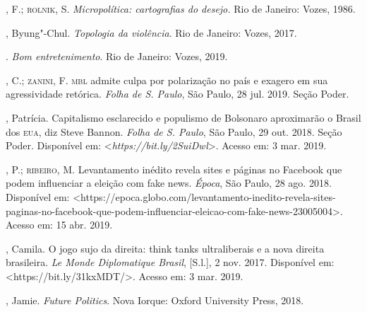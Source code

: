 \begin{bibliohedra}
, F.; \textsc{rolnik}, S. \emph{Micropolítica: cartografias do desejo.}
Rio de Janeiro: Vozes, 1986.

, Byung"-Chul. \emph{Topologia da violência}. Rio de Janeiro: Vozes,
2017.

\titidem. \emph{Bom entretenimento}. Rio de Janeiro: Vozes, 2019.

, C.; \textsc{zanini}, F. \textsc{mbl} admite culpa por polarização no país e
exagero em sua agressividade retórica. \emph{Folha de S. Paulo}, São
Paulo, 28 jul. 2019. Seção Poder.

, Patrícia. Capitalismo esclarecido e populismo de Bolsonaro
aproximarão o Brasil dos \textsc{eua}, diz Steve Bannon. \emph{Folha de S.
Paulo}, São Paulo, 29 out. 2018. Seção Poder. Disponível em:
\textless{}\emph{https://bit.ly/2SuiDwl}\textgreater{}.
Acesso em: 3 mar. 2019.

, P.; \textsc{ribeiro}, M. Levantamento inédito revela sites e páginas
no Facebook que podem influenciar a eleição com fake news. \emph{Época},
São Paulo, 28 ago. 2018. Disponível em:
\textless{}https://epoca.globo.com/levantamento-inedito-revela-sites-paginas-no-facebook-que-podem-influenciar-eleicao-com-fake-news-23005004\textgreater{}.
Acesso em: 15 abr. 2019.

, Camila. O jogo sujo da direita: think tanks ultraliberais e a
nova direita brasileira. \emph{Le Monde Diplomatique Brasil},
{[}S.l.{]}, 2 nov. 2017. Disponível em:
\textless{}https://bit.ly/31kxMDT/\textgreater{}.
Acesso em: 3 mar. 2019.

, Jamie. \emph{Future Politics}. Nova Iorque: Oxford University
Press, 2018.
\end{bibliohedra}


